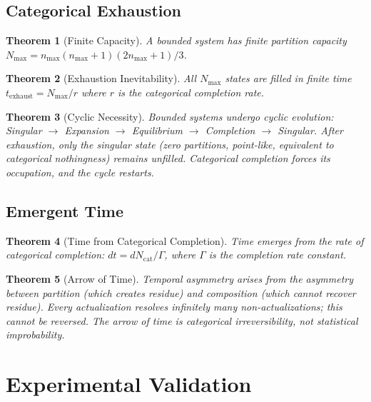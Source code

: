 \documentclass[twocolumn,10pt,a4paper]{article}
\newtheorem{theorem}{Theorem}[section]
\theoremstyle{definition}
\theoremstyle{remark}
\begin{document}
\subsection{Categorical Exhaustion}

\begin{theorem}[Finite Capacity]
A bounded system has finite partition capacity $N_{\max} = n_{\max}(n_{\max}+1)(2n_{\max}+1)/3$.
\end{theorem}

\begin{theorem}[Exhaustion Inevitability]
\label{thm:exhaustion}
All $N_{\max}$ states are filled in finite time $t_{\text{exhaust}} = N_{\max}/r$ where $r$ is the categorical completion rate.
\end{theorem}

\begin{theorem}[Cyclic Necessity]
\label{thm:cyclic}
Bounded systems undergo cyclic evolution: Singular $\to$ Expansion $\to$ Equilibrium $\to$ Completion $\to$ Singular. After exhaustion, only the singular state (zero partitions, point-like, equivalent to categorical nothingness) remains unfilled. Categorical completion forces its occupation, and the cycle restarts.
\end{theorem}

\subsection{Emergent Time}

\begin{theorem}[Time from Categorical Completion]
\label{thm:time}
Time emerges from the rate of categorical completion: $dt = dN_{\text{cat}}/\Gamma$, where $\Gamma$ is the completion rate constant.
\end{theorem}

\begin{theorem}[Arrow of Time]
\label{thm:arrow}
Temporal asymmetry arises from the asymmetry between partition (which creates residue) and composition (which cannot recover residue). Every actualization resolves infinitely many non-actualizations; this cannot be reversed. The arrow of time is categorical irreversibility, not statistical improbability.
\end{theorem}

\section{Experimental Validation}
\label{sec:validation}
\end{document}
